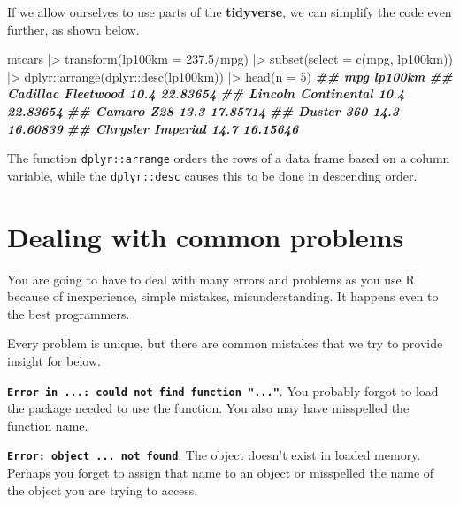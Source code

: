 \documentclass[
]{book}
\newenvironment{Shaded}{\begin{snugshade}}{\end{snugshade}}
\newcommand{\AttributeTok}[1]{\textcolor[rgb]{0.77,0.63,0.00}{#1}}
\newcommand{\DecValTok}[1]{\textcolor[rgb]{0.00,0.00,0.81}{#1}}
\newcommand{\DocumentationTok}[1]{\textcolor[rgb]{0.56,0.35,0.01}{\textbf{\textit{#1}}}}
\newcommand{\FloatTok}[1]{\textcolor[rgb]{0.00,0.00,0.81}{#1}}
\newcommand{\FunctionTok}[1]{\textcolor[rgb]{0.00,0.00,0.00}{#1}}
\newcommand{\NormalTok}[1]{#1}
\newcommand{\SpecialCharTok}[1]{\textcolor[rgb]{0.00,0.00,0.00}{#1}}
\theoremstyle{definition}
\theoremstyle{definition}
\theoremstyle{definition}
\theoremstyle{definition}
\theoremstyle{remark}
\begin{document}
If we allow ourselves to use parts of the \textbf{tidyverse}, we can simplify the code even further, as shown below.

\begin{Shaded}
\begin{Highlighting}[]
\NormalTok{mtcars }\SpecialCharTok{|\textgreater{}}
  \FunctionTok{transform}\NormalTok{(}\AttributeTok{lp100km =} \FloatTok{237.5}\SpecialCharTok{/}\NormalTok{mpg) }\SpecialCharTok{|\textgreater{}}
  \FunctionTok{subset}\NormalTok{(}\AttributeTok{select =} \FunctionTok{c}\NormalTok{(mpg, lp100km)) }\SpecialCharTok{|\textgreater{}}
\NormalTok{  dplyr}\SpecialCharTok{::}\FunctionTok{arrange}\NormalTok{(dplyr}\SpecialCharTok{::}\FunctionTok{desc}\NormalTok{(lp100km)) }\SpecialCharTok{|\textgreater{}}
  \FunctionTok{head}\NormalTok{(}\AttributeTok{n =} \DecValTok{5}\NormalTok{)}
\DocumentationTok{\#\#                      mpg  lp100km}
\DocumentationTok{\#\# Cadillac Fleetwood  10.4 22.83654}
\DocumentationTok{\#\# Lincoln Continental 10.4 22.83654}
\DocumentationTok{\#\# Camaro Z28          13.3 17.85714}
\DocumentationTok{\#\# Duster 360          14.3 16.60839}
\DocumentationTok{\#\# Chrysler Imperial   14.7 16.15646}
\end{Highlighting}
\end{Shaded}

The function \texttt{dplyr::arrange} orders the rows of a data frame based on a column variable, while the \texttt{dplyr::desc} causes this to be done in descending order.

\hypertarget{dealing-with-common-problems}{%
\section{Dealing with common problems}\label{dealing-with-common-problems}}

You are going to have to deal with many errors and problems as you use R because of inexperience, simple mistakes, misunderstanding. It happens even to the best programmers.

Every problem is unique, but there are common mistakes that we try to provide insight for below.

\textbf{\texttt{Error\ in\ ...:\ could\ not\ find\ function\ "..."}}. You probably forgot to load the package needed to use the function. You also may have misspelled the function name.

\textbf{\texttt{Error:\ object\ \textquotesingle{}...\textquotesingle{}\ not\ found}}. The object doesn't exist in loaded memory. Perhaps you forget to assign that name to an object or misspelled the name of the object you are trying to access.
\end{document}
